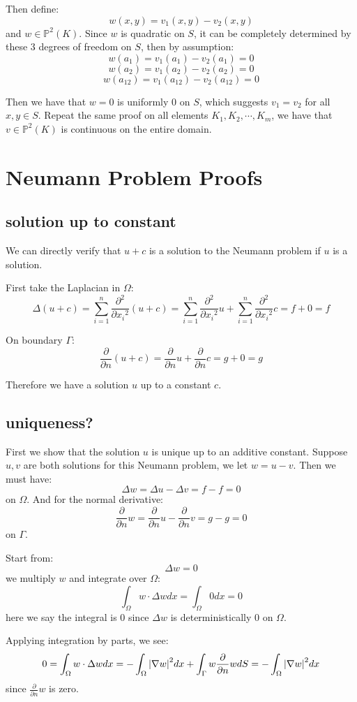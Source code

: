 \documentclass[12pt]{article} %
\newcommand{\pdx}[1]{\frac{\partial}{\partial {#1}}}
\newcommand{\pddx}[1]{\frac{\partial^2}{\partial {#1}^2}}
\newcommand{\1}[1]{\mathds{1}\left[#1\right]}
\begin{document}
Then define:
$$
	w(x,y) = v_1(x,y) - v_2(x,y)
$$ and $w \in \mathbb{P}^2(K)$. Since $w$ is quadratic on $S$, it can be completely determined by these 3 degrees of freedom on $S$, then by assumption:
$$
	w(a_1) = v_1(a_{1}) - v_2(a_{1}) = 0
$$
$$
	w(a_2) = v_1(a_{2}) - v_2(a_{2}) = 0
$$
$$
	w(a_{12}) = v_1(a_{12}) - v_2(a_{12}) = 0
$$

Then we have that $w = 0$ is uniformly 0 on $S$, which suggests $v_1 = v_2$ for all $x,y\in S$. Repeat the same proof on all elements $K_1,K_2,\cdots,K_m$, we have that $v\in \mathbb{P}^2(K)$ is continuous on the entire domain.


\section{Neumann Problem Proofs}
\subsection{solution up to constant}
We can directly verify that $u + c$ is a solution to the Neumann problem if $u$ is a solution.

First take the Laplacian in $\Omega$:
$$
	\Delta(u+c) = \sum_{i=1}^{n}\pddx{x_i}(u+c) = \sum_{i=1}^n\pddx{x_i}u + \sum_{i=1}^{n}\pddx{x_i}c = f + 0 = f
$$

On boundary $\Gamma$:
$$
	\pdx{n}(u+c) = \pdx{n}u + \pdx{n}c = g + 0 = g
$$

Therefore we have a solution $u$ up to a constant $c$.

\subsection{uniqueness?}
First we show that the solution $u$ is unique up to an additive constant. Suppose $u,v$ are both solutions for this Neumann problem, we let $w = u - v$. Then we must have:
$$
	\Delta w = \Delta u - \Delta v = f - f = 0
$$ on $\Omega$. And for the normal derivative:
$$
	\pdx{n}w = \pdx{n}u - \pdx{n}v = g - g = 0
$$ on $\Gamma$.

Start from:
$$
	\Delta w = 0
$$ we multiply $w$ and integrate over $\Omega$:
$$
	\int_{\Omega} w \cdot \Delta w dx = \int_{\Omega} 0 dx = 0
$$ here we say the integral is 0 since $\Delta w$ is deterministically 0 on $\Omega$.

Applying integration by parts, we see:
$$
	0 = \int_{\Omega} w \cdot \Delta w dx = 
	-\int_{\Omega}\abs{\nabla w}^2 dx + \int_{\Gamma}w \pdx{n}w dS = -\int_{\Omega}\abs{\nabla w}^2 dx
$$ since $\pdx{n}w$ is zero.
\end{document}

